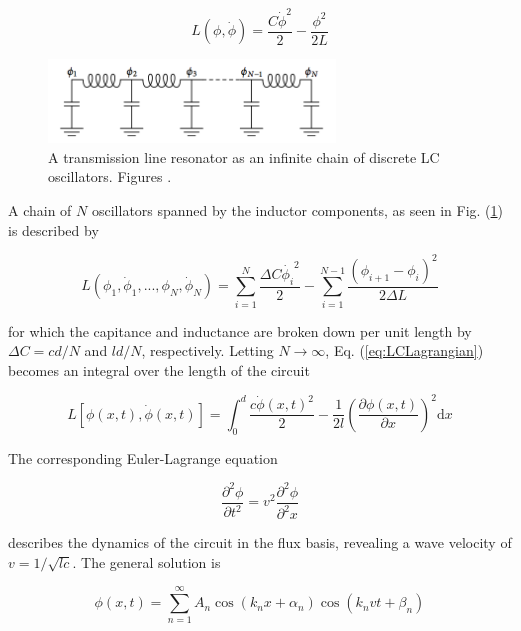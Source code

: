 \documentclass[12 pt]{book}
\begin{document}
\begin{equation}
L(\phi, \dot{\phi})=\frac{C\dot{\phi}^2}{2}-\frac{\phi^2}{2L}
\end{equation}

\begin{figure}[h] 
   \centering
   \includegraphics[width=3in]{BishopLCChain.png} 
   \caption{A transmission line resonator as an infinite chain of discrete LC oscillators. Figures \cite{Bishop}.}
   \label{fig:LCChain}
\end{figure}

A chain of $N$ oscillators spanned by the inductor components, as seen in Fig. (\ref{fig:LCChain}) is described by 

\begin{equation}\label{eq:LCLagrangian}
L(\phi_1, \dot{\phi}_1,...,\phi_N, \dot{\phi}_N)=
\sum_{i=1}^N \frac{\Delta C \dot{\phi_i}^2}{2} -
\sum_{i=1}^{N-1}\frac{(\phi_{i+1}-\phi_i)^2}{2\Delta L}
\end{equation}

for which the capitance and inductance are broken down per unit length by $\Delta C=cd/N$ and $ld/N$, respectively. Letting $N\rightarrow \infty$, Eq. (\ref{eq:LCLagrangian}) becomes an integral over the length of the circuit

\begin{equation}\label{eq:LCLagrangianIntegral}
L[\phi(x,t),\dot{\phi}(x,t)]=
\int_0^d\frac{c\dot{\phi}(x,t)^2}{2}-\frac{1}{2l}\left(\frac{\partial\phi(x,t)}{\partial x}\right)^2\mathrm{d}x
\end{equation}

The corresponding Euler-Lagrange equation

\begin{equation}
\frac{\partial^2\phi}{\partial t^2}=v^2\frac{\partial^2\phi}{\partial^2 x}
\end{equation}

describes the dynamics of the circuit in the flux basis, revealing a wave velocity of $v=1/\sqrt{lc}$. The general solution is

\begin{equation}\label{eq:ELSolution}
\phi(x,t)=\sum_{n=1}^\infty A_n\cos(k_nx+\alpha_n)\cos(k_nvt+\beta_n)
\end{equation}
\end{document}
